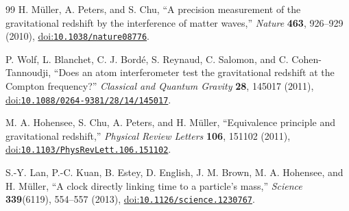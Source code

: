 \documentclass[12pt]{article}
\begin{document}
\begin{thebibliography}{99}
H. M\"uller, A. Peters, and S. Chu,
``A precision measurement of the gravitational redshift by the interference of matter waves,''
\emph{Nature} \textbf{463}, 926--929 (2010),
\href{https://doi.org/10.1038/nature08776}{doi:\nolinkurl{10.1038/nature08776}}.

P. Wolf, L. Blanchet, C. J. Bord\'e, S. Reynaud, C. Salomon, and C. Cohen-Tannoudji,
``Does an atom interferometer test the gravitational redshift at the Compton frequency?''
\emph{Classical and Quantum Gravity} \textbf{28}, 145017 (2011),
\href{https://doi.org/10.1088/0264-9381/28/14/145017}{doi:\nolinkurl{10.1088/0264-9381/28/14/145017}}.

M. A. Hohensee, S. Chu, A. Peters, and H. M\"uller,
``Equivalence principle and gravitational redshift,''
\emph{Physical Review Letters} \textbf{106}, 151102 (2011),
\href{https://doi.org/10.1103/PhysRevLett.106.151102}{doi:\nolinkurl{10.1103/PhysRevLett.106.151102}}.

S.-Y. Lan, P.-C. Kuan, B. Estey, D. English, J. M. Brown, M. A. Hohensee, and H. M\"uller,
``A clock directly linking time to a particle's mass,''
\emph{Science} \textbf{339}(6119), 554--557 (2013),
\href{https://doi.org/10.1126/science.1230767}{doi:\nolinkurl{10.1126/science.1230767}}.

\end{thebibliography}
\end{document}
